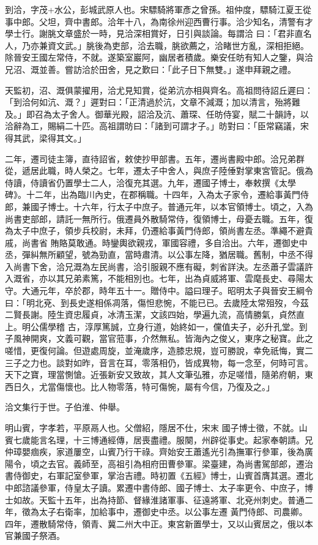 \begin{pinyinscope}
 到洽，字茂+水公，彭城武原人也。宋驃騎將軍彥之曾孫。祖仲度，驃騎江夏王從事中郎。父坦，齊中書郎。洽年十八，為南徐州迎西曹行事。洽少知名，清警有才學士行。謝朓文章盛於一時，見洽深相賞好，日引與談論。每謂洽
 曰：「君非直名人，乃亦兼資文武。」朓後為吏部，洽去職，朓欲薦之，洽睹世方亂，深相拒絕。除晉安王國左常侍，不就。遂築室巖阿，幽居者積歲。樂安任昉有知人之鑒，與洽兄沼、溉並善。嘗訪洽於田舍，見之歎曰：「此子日下無雙。」遂申拜親之禮。



 天監初，沼、溉俱蒙擢用，洽尤見知賞，從弟沆亦相與齊名。高祖問待詔丘遲曰：「到洽何如沆、溉？」遲對曰：「正清過於沆，文章不減溉；加以清言，殆將難及。」即召為太子舍人。御華光殿，詔洽及沆、蕭琛、任昉侍宴，賦二十韻詩，以洽辭為工，賜絹二十匹。高祖謂昉曰：「諸到可謂才子。」昉對曰：「臣常竊議，宋得其武，梁得其文。」



 二年，遷司徒主簿，直待詔省，敕使抄甲部書。五年，遷尚書殿中郎。洽兄弟群從，遞居此職，時人榮之。七年，遷太子中舍人，與庶子陸倕對掌東宮管記。俄為侍讀，侍讀省仍置學士二人，洽復充其選。九年，遷國子博士，奉敕撰《太學碑》。十二年，出為臨川內史，在郡稱職。十四年，入為太子家令，遷給事黃門侍郎，兼國子博士。十六年，行太子中庶子。普通元年，以本官領博士。頃之，入為尚書吏部郎，請託一無所行。俄遷員外散騎常侍，復領博士，母憂去職。五年，復為太子中庶子，領步兵校尉，未拜，仍遷給事黃門侍郎，領尚書左丞。準繩不避貴戚，尚書省
 賄賂莫敢通。時鑾輿欲親戎，軍國容禮，多自洽出。六年，遷御史中丞，彈糾無所顧望，號為勁直，當時肅清。以公事左降，猶居職。舊制，中丞不得入尚書下舍，洽兄溉為左民尚書，洽引服親不應有礙，刺省詳決。左丞蕭子雲議許入溉省，亦以其兄弟素篤，不能相別也。七年，出為貞威將軍、雲麾長史、尋陽太守。大通元年，卒於郡，時年五十一。贈侍中。謚曰理子。昭明太子與晉安王綱令曰：「明北兗、到長史遂相係凋落，傷怛悲惋，不能已已。去歲陸太常殂歿，今茲二賢長謝。陸生資忠履貞，冰清玉潔，文該四始，學遍九流，高情勝氣，貞然直上。明公儒學稽
 古，淳厚篤誠，立身行道，始終如一，儻值夫子，必升孔堂。到子風神開爽，文義可觀，當官蒞事，介然無私。皆海內之俊乂，東序之秘寶。此之嗟惜，更復何論。但遊處周旋，並淹歲序，造膝忠規，豈可勝說，幸免祇悔，實二三子之力也。談對如昨，音言在耳，零落相仍，皆成異物，每一念至，何時可言。天下之寶，理當惻愴。近張新安又致故，其人文筆弘雅，亦足嗟惜，隨弟府朝，東西日久，尤當傷懷也。比人物零落，特可傷惋，屬有今信，乃復及之。」



 洽文集行于世。子伯淮、仲舉。



 明山賓，字孝若，平原鬲人也。父僧紹，隱居不仕，宋末
 國子博士徵，不就。山賓七歲能言名理，十三博通經傳，居喪盡禮。服闋，州辟從事史。起家奉朝請。兄仲璋嬰痼疾，家道屢空，山賓乃行干祿。齊始安王蕭遙光引為撫軍行參軍，後為廣陽令，頃之去官。義師至，高祖引為相府田曹參軍。梁臺建，為尚書駕部郎，遷治書侍御史，右軍記室參軍，掌治吉禮。時初置《五經》博士，山賓首膺其選。遷北中郎諮議參軍，侍皇太子讀。累遷中書侍郎、國子博士、太子率更令、中庶子，博士如故。天監十五年，出為持節、督緣淮諸軍事、征遠將軍、北兗州刺史。普通二年，徵為太子右衛率，加給事中，遷御史中丞。以公事左遷
 黃門侍郎、司農卿。四年，遷散騎常侍，領青、冀二州大中正。東宮新置學士，又以山賓居之，俄以本官兼國子祭酒。




\end{pinyinscope}
